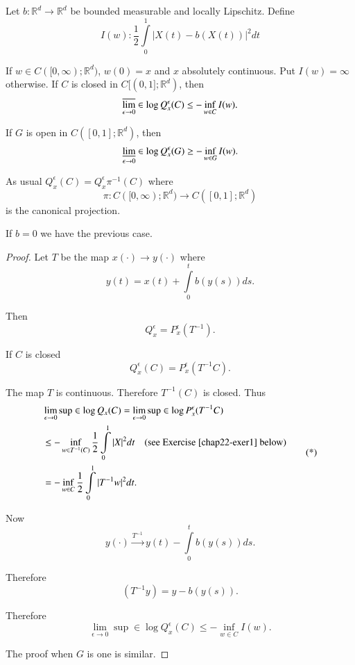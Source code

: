 \begin{theorem*}
Let $b:\mathbb{R}^{d}\to \mathbb{R}^{d}$ be bounded measurable and
locally Lipschitz. Define
$$
I(w):\frac{1}{2}\int\limits^{1}_{0}|X(t)-b(X(t))|^{2}dt
$$\pageoriginale

If $w\in C([0,\infty);\mathbb{R}^{d})$, $w(0)=x$ and $x$ absolutely
  continuous. Put $I(w)=\infty$ otherwise. If $C$ is closed in
  $C[(0,1];\mathbb{R}^{d})$, then
$$
\varlimsup\limits_{\epsilon\to 0}\in \log Q^{\epsilon}_{x}(C)\leq
-\inf\limits_{w\in C}I(w).
$$

If $G$ is open in $C([0,1];\mathbb{R}^{d})$, then
$$
\varliminf\limits_{\epsilon\to 0}\in \log Q^{\epsilon}_{x}(G)\geq
-\inf\limits_{w\in G}I(w).
$$

As usual $Q^{\epsilon}_{x}(C)=Q^{\epsilon}_{x}\pi^{-1}(C)$ where
$$
\pi:C([0,\infty); \mathbb{R}^{d})\to C([0,1];\mathbb{R}^{d})
$$ 
is the canonical projection. 
\end{theorem*}

\begin{remark*}
If $b=0$ we have the previous case.
\end{remark*}

\begin{proof}
Let $T$ be the map $x(\cdot)\to y(\cdot)$ where
$$
y(t)=x(t)+\int\limits^{t}_{0}b(y(s))ds.
$$

Then
$$
Q^{\epsilon}_{x}=P^{\epsilon}_{x}(T^{-1}).
$$

If $C$ is closed
$$
Q^{\epsilon}_{x}(C)=P^{\epsilon}_{x}(T^{-1}C).
$$

The map $T$ is continuous. Therefore $T^{-1}(C)$ is closed. Thus
\begin{equation*}
\begin{split}
& \lim\limits_{\epsilon\to 0}\sup \in \log
Q_{x}(C)=\lim\limits_{\epsilon\to 0}\sup \in \log
P^{\epsilon}_{x}(T^{-1}C)\\
& \leq -\inf\limits_{w\in
  T^{-1}(C)}\frac{1}{2}\int\limits^{1}_{0}|X|^{2}dt\quad \text{(see
  Exercise \ref{chap22-exer1} below)}\\
&= -\inf\limits_{w\in C}\frac{1}{2}\int\limits^{1}_{0}|T^{-1}w|^{2}dt.
\end{split}\tag{*}
\end{equation*}

Now\pageoriginale
$$
y(\cdot)\xrightarrow{T^{-1}}y(t)-\int\limits^{t}_{0}b(y(s))ds.
$$

Therefore
$$
(T^{-1}y)=y-b(y(s)).
$$

Therefore
$$
\lim\limits_{\epsilon\to 0}\sup \in \log Q^{\epsilon}_{x}(C)\leq
-\inf\limits_{w\in C}I(w).
$$

The proof when $G$ is one is similar.
\end{proof}

